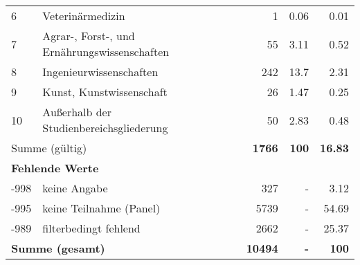 \begin{longtable}{lXrrr}
     6 &
     \multicolumn{1}{X}{ Veterinärmedizin   } &


       \num{1} &
       \num[round-mode=places,round-precision=2]{0.06} &
         \num[round-mode=places,round-precision=2]{0.01} \\

     7 &
     \multicolumn{1}{X}{ Agrar-, Forst-, und Ernährungswissenschaften   } &


       \num{55} &
       \num[round-mode=places,round-precision=2]{3.11} &
         \num[round-mode=places,round-precision=2]{0.52} \\

     8 &
     \multicolumn{1}{X}{ Ingenieurwissenschaften   } &


       \num{242} &
       \num[round-mode=places,round-precision=2]{13.7} &
         \num[round-mode=places,round-precision=2]{2.31} \\

     9 &
     \multicolumn{1}{X}{ Kunst, Kunstwissenschaft   } &


       \num{26} &
       \num[round-mode=places,round-precision=2]{1.47} &
         \num[round-mode=places,round-precision=2]{0.25} \\

     10 &
     \multicolumn{1}{X}{ Außerhalb der Studienbereichsgliederung   } &


       \num{50} &
       \num[round-mode=places,round-precision=2]{2.83} &
         \num[round-mode=places,round-precision=2]{0.48} \\
     \midrule
     \multicolumn{2}{l}{Summe (gültig)} &
       \textbf{\num{1766}} &
     \textbf{\num{100}} &
       \textbf{\num[round-mode=places,round-precision=2]{16.83}} \\
     \multicolumn{5}{l}{\textbf{Fehlende Werte}}\\
       -998 &
       keine Angabe &
         \num{327} &
        - &
         \num[round-mode=places,round-precision=2]{3.12} \\
       -995 &
       keine Teilnahme (Panel) &
         \num{5739} &
        - &
         \num[round-mode=places,round-precision=2]{54.69} \\
       -989 &
       filterbedingt fehlend &
         \num{2662} &
        - &
         \num[round-mode=places,round-precision=2]{25.37} \\
     \midrule
     \multicolumn{2}{l}{\textbf{Summe (gesamt)}} &
          \textbf{\num{10494}} &
        \textbf{-} &
        \textbf{\num{100}} \\
     \bottomrule
     \end{longtable}
     
